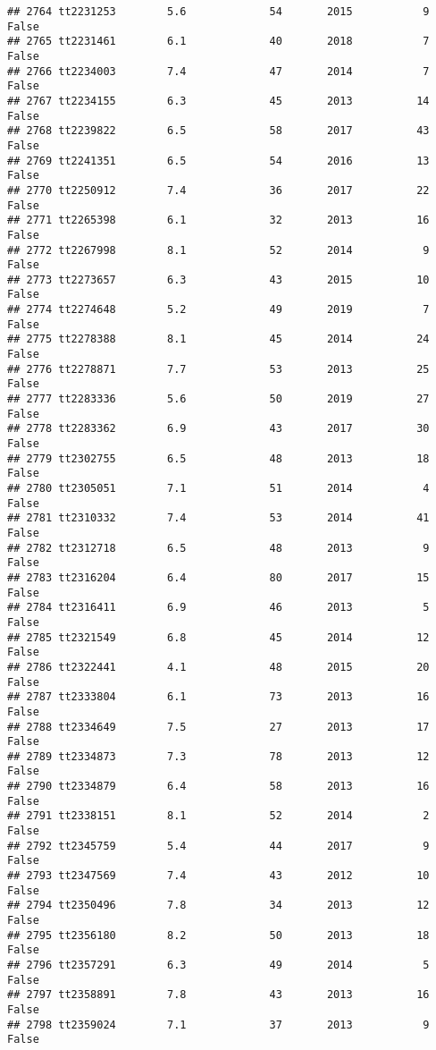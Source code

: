 \documentclass[
]{article}
\begin{document}
\begin{verbatim}
## 2764 tt2231253        5.6             54       2015           9   False
## 2765 tt2231461        6.1             40       2018           7   False
## 2766 tt2234003        7.4             47       2014           7   False
## 2767 tt2234155        6.3             45       2013          14   False
## 2768 tt2239822        6.5             58       2017          43   False
## 2769 tt2241351        6.5             54       2016          13   False
## 2770 tt2250912        7.4             36       2017          22   False
## 2771 tt2265398        6.1             32       2013          16   False
## 2772 tt2267998        8.1             52       2014           9   False
## 2773 tt2273657        6.3             43       2015          10   False
## 2774 tt2274648        5.2             49       2019           7   False
## 2775 tt2278388        8.1             45       2014          24   False
## 2776 tt2278871        7.7             53       2013          25   False
## 2777 tt2283336        5.6             50       2019          27   False
## 2778 tt2283362        6.9             43       2017          30   False
## 2779 tt2302755        6.5             48       2013          18   False
## 2780 tt2305051        7.1             51       2014           4   False
## 2781 tt2310332        7.4             53       2014          41   False
## 2782 tt2312718        6.5             48       2013           9   False
## 2783 tt2316204        6.4             80       2017          15   False
## 2784 tt2316411        6.9             46       2013           5   False
## 2785 tt2321549        6.8             45       2014          12   False
## 2786 tt2322441        4.1             48       2015          20   False
## 2787 tt2333804        6.1             73       2013          16   False
## 2788 tt2334649        7.5             27       2013          17   False
## 2789 tt2334873        7.3             78       2013          12   False
## 2790 tt2334879        6.4             58       2013          16   False
## 2791 tt2338151        8.1             52       2014           2   False
## 2792 tt2345759        5.4             44       2017           9   False
## 2793 tt2347569        7.4             43       2012          10   False
## 2794 tt2350496        7.8             34       2013          12   False
## 2795 tt2356180        8.2             50       2013          18   False
## 2796 tt2357291        6.3             49       2014           5   False
## 2797 tt2358891        7.8             43       2013          16   False
## 2798 tt2359024        7.1             37       2013           9   False

\end{verbatim}
\end{document}
